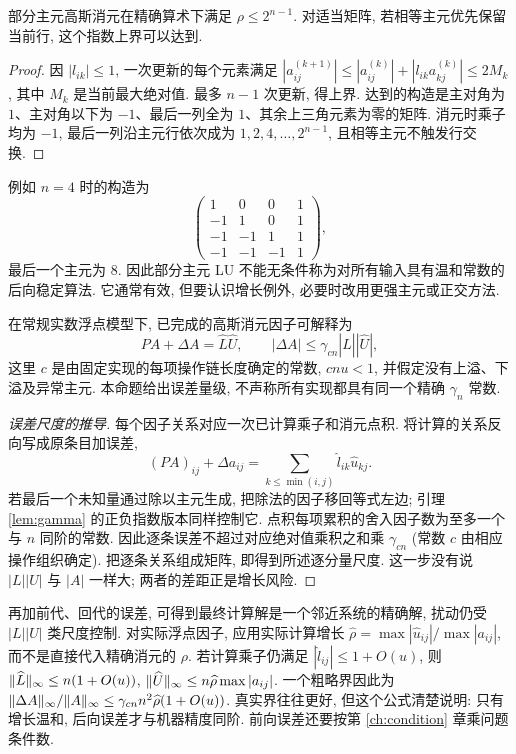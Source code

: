 \begin{proposition}
部分主元高斯消元在精确算术下满足 $\rho\le2^{n-1}$. 对适当矩阵, 若相等主元优先保留当前行, 这个指数上界可以达到.
\end{proposition}
\begin{proof}
因 $|l_{ik}|\le1$, 一次更新的每个元素满足
$|a_{ij}^{(k+1)}|\le|a_{ij}^{(k)}|+|l_{ik}a_{kj}^{(k)}|\le2M_k$,
其中 $M_k$ 是当前最大绝对值. 最多 $n-1$ 次更新, 得上界. 达到的构造是主对角为 $1$、主对角以下为 $-1$、最后一列全为 $1$、其余上三角元素为零的矩阵. 消元时乘子均为 $-1$, 最后一列沿主元行依次成为 $1,2,4,\ldots,2^{n-1}$, 且相等主元不触发行交换.
\end{proof}
例如 $n=4$ 时的构造为
\[
\begin{pmatrix}1&0&0&1\\-1&1&0&1\\-1&-1&1&1\\-1&-1&-1&1\end{pmatrix},
\]
最后一个主元为 $8$. 因此部分主元 LU 不能无条件称为对所有输入具有温和常数的后向稳定算法. 它通常有效, 但要认识增长例外, 必要时改用更强主元或正交方法.

\begin{proposition}[LU 因子残差的标准尺度]
在常规实数浮点模型下, 已完成的高斯消元因子可解释为
\[
PA+\Delta A=\widehat L\widehat U,\qquad
|\Delta A|\le\gamma_{cn}|\widehat L||\widehat U|,
\]
这里 $c$ 是由固定实现的每项操作链长度确定的常数, $cnu<1$, 并假定没有上溢、下溢及异常主元. 本命题给出误差量级, 不声称所有实现都具有同一个精确 $\gamma_n$ 常数.
\end{proposition}
\begin{proof}[误差尺度的推导]
每个因子关系对应一次已计算乘子和消元点积. 将计算的关系反向写成原条目加误差,
\[
(PA)_{ij}+\Delta a_{ij}=\sum_{k\le\min(i,j)}\widehat l_{ik}\widehat u_{kj}.
\]
若最后一个未知量通过除以主元生成, 把除法的因子移回等式左边; 引理 \ref{lem:gamma} 的正负指数版本同样控制它. 点积每项累积的舍入因子数为至多一个与 $n$ 同阶的常数. 因此逐条误差不超过对应绝对值乘积之和乘 $\gamma_{cn}$ (常数 $c$ 由相应操作组织确定). 把逐条关系组成矩阵, 即得到所述逐分量尺度. 这一步没有说 $|L||U|$ 与 $|A|$ 一样大; 两者的差距正是增长风险.
\end{proof}
再加前代、回代的误差, 可得到最终计算解是一个邻近系统的精确解, 扰动仍受 $|L||U|$ 类尺度控制. 对实际浮点因子, 应用实际计算增长 $\widehat\rho=\max|\widehat u_{ij}|/\max|a_{ij}|$, 而不是直接代入精确消元的 $\rho$. 若计算乘子仍满足 $|\widehat l_{ij}|\le1+O(u)$, 则 $\lVert \widehat L\rVert_\infty\le n(1+O(u))$, $\lVert \widehat U\rVert_\infty\le n\widehat\rho\max|a_{ij}|$. 一个粗略界因此为
$\lVert \Delta A\rVert_\infty/\lVert A\rVert_\infty\le\gamma_{cn} n^2\widehat\rho(1+O(u))$.
真实界往往更好, 但这个公式清楚说明: 只有增长温和, 后向误差才与机器精度同阶. 前向误差还要按第 \ref{ch:condition} 章乘问题条件数.

